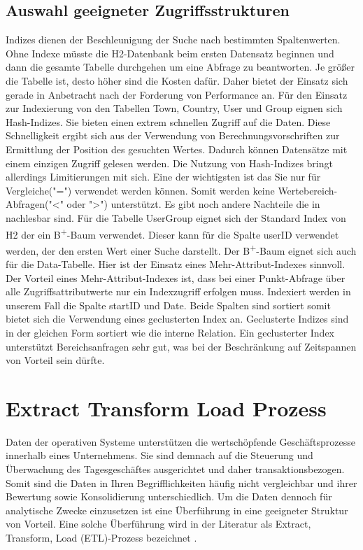 \subsection{Auswahl geeigneter Zugriffsstrukturen}

Indizes dienen der Beschleunigung der Suche nach bestimmten Spaltenwerten. Ohne Indexe müsste die H2-Datenbank beim ersten Datensatz beginnen und dann die gesamte Tabelle durchgehen um eine Abfrage zu beantworten. Je größer die Tabelle ist, desto höher sind die Kosten dafür. Daher bietet der Einsatz sich gerade in Anbetracht nach der Forderung von Performance an. Für den Einsatz zur Indexierung von den Tabellen Town, Country, User und Group eignen sich Hash-Indizes. Sie bieten einen extrem schnellen Zugriff auf die Daten. Diese Schnelligkeit ergibt sich aus der Verwendung von Berechnungsvorschriften zur Ermittlung der Position des gesuchten Wertes. Dadurch können Datensätze mit einem einzigen Zugriff gelesen werden. Die Nutzung von Hash-Indizes bringt allerdings Limitierungen mit sich. Eine der wichtigsten ist das Sie nur für Vergleiche("=") verwendet werden können. Somit werden keine Wertebereich-Abfragen("<" oder ">") unterstützt. Es gibt noch andere Nachteile die in \cite{SWB-352401869} nachlesbar sind. 
Für die Tabelle UserGroup eignet sich der Standard Index von H2 der ein B\textsuperscript{+}-Baum verwendet. Dieser kann für die Spalte userID verwendet werden, der den ersten Wert einer Suche darstellt. Der B\textsuperscript{+}-Baum eignet sich auch für die Data-Tabelle. Hier ist der Einsatz eines Mehr-Attribut-Indexes sinnvoll. Der Vorteil eines Mehr-Attribut-Indexes ist, dass bei einer Punkt-Abfrage über alle Zugriffsattributwerte nur ein Indexzugriff erfolgen muss. Indexiert werden in unserem Fall die Spalte startID und Date. Beide Spalten sind sortiert somit bietet sich  die Verwendung eines geclusterten Index an. Geclusterte Indizes sind in der gleichen Form sortiert wie die interne Relation. Ein geclusterter Index unterstützt Bereichsanfragen sehr gut, was bei der Beschränkung auf Zeitspannen von Vorteil sein dürfte.       


\section{Extract Transform Load Prozess}

Daten der operativen Systeme unterstützen die wertschöpfende Geschäftsprozesse innerhalb eines Unternehmens. Sie sind demnach auf die Steuerung und Überwachung des Tagesgeschäftes ausgerichtet und daher transaktionsbezogen. Somit sind die Daten in Ihren Begrifflichkeiten häufig nicht vergleichbar und ihrer Bewertung sowie Konsolidierung unterschiedlich. Um die Daten dennoch für analytische Zwecke einzusetzen ist eine Überführung in eine geeigneter Struktur von Vorteil. Eine solche Überführung wird in der Literatur als Extract, Transform, Load (ETL)-Prozess bezeichnet \cite{ElSappagh201191}. 

